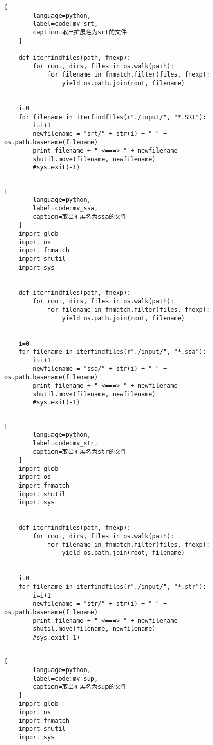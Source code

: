 \begin{appendices}
\begin{lstlisting}[
        language=python,
        label=code:mv_srt,
        caption=取出扩展名为srt的文件
    ]
    
    def iterfindfiles(path, fnexp):
        for root, dirs, files in os.walk(path):
            for filename in fnmatch.filter(files, fnexp):
                yield os.path.join(root, filename)
    
    
    i=0
    for filename in iterfindfiles(r"./input/", "*.SRT"):
        i=i+1
        newfilename = "srt/" + str(i) + "_" + os.path.basename(filename)
        print filename + " <===> " + newfilename
        shutil.move(filename, newfilename)
        #sys.exit(-1)
    
    \end{lstlisting}
    \begin{lstlisting}[
        language=python,
        label=code:mv_ssa,
        caption=取出扩展名为ssa的文件
    ]
    import glob
    import os
    import fnmatch
    import shutil
    import sys
    
    
    def iterfindfiles(path, fnexp):
        for root, dirs, files in os.walk(path):
            for filename in fnmatch.filter(files, fnexp):
                yield os.path.join(root, filename)
    
    
    i=0
    for filename in iterfindfiles(r"./input/", "*.ssa"):
        i=i+1
        newfilename = "ssa/" + str(i) + "_" + os.path.basename(filename)
        print filename + " <===> " + newfilename
        shutil.move(filename, newfilename)
        #sys.exit(-1)
    
    \end{lstlisting}
    \begin{lstlisting}[
        language=python,
        label=code:mv_str,
        caption=取出扩展名为str的文件
    ]
    import glob
    import os
    import fnmatch
    import shutil
    import sys
    
    
    def iterfindfiles(path, fnexp):
        for root, dirs, files in os.walk(path):
            for filename in fnmatch.filter(files, fnexp):
                yield os.path.join(root, filename)
    
    
    i=0
    for filename in iterfindfiles(r"./input/", "*.str"):
        i=i+1
        newfilename = "str/" + str(i) + "_" + os.path.basename(filename)
        print filename + " <===> " + newfilename
        shutil.move(filename, newfilename)
        #sys.exit(-1)
    
    \end{lstlisting}
    \begin{lstlisting}[
        language=python,
        label=code:mv_sup,
        caption=取出扩展名为sup的文件
    ]
    import glob
    import os
    import fnmatch
    import shutil
    import sys
    

\end{lstlisting}
\end{appendices}
